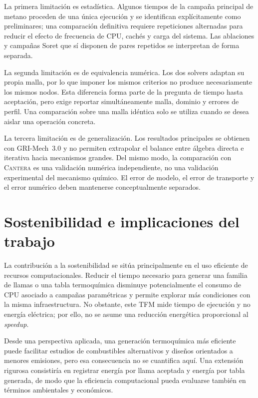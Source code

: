 \documentclass[12pt,a4paper,twoside,openany]{book}
\newcommand{\Cantera}{\textsc{Cantera}\xspace}
\begin{document}
La primera limitación es estadística. Algunos tiempos de la campaña principal de
metano proceden de una única ejecución y se identifican explícitamente como
preliminares; una comparación definitiva requiere repeticiones alternadas para
reducir el efecto de frecuencia de CPU, cachés y carga del sistema. Las
ablaciones y campañas Soret que sí disponen de pares repetidos se interpretan de
forma separada.

La segunda limitación es de equivalencia numérica. Los dos solvers adaptan su
propia malla, por lo que imponer los mismos criterios no produce necesariamente
los mismos nodos. Esta diferencia forma parte de la pregunta de tiempo hasta
aceptación, pero exige reportar simultáneamente malla, dominio y errores de
perfil. Una comparación sobre una malla idéntica solo se utiliza cuando se desea
aislar una operación concreta.

La tercera limitación es de generalización. Los resultados principales se
obtienen con GRI-Mech~3.0 y no permiten extrapolar el balance entre álgebra
directa e iterativa hacia mecanismos grandes. Del mismo modo, la comparación
con \Cantera es una validación numérica independiente, no una validación
experimental del mecanismo químico. El error de modelo, el error de transporte
y el error numérico deben mantenerse conceptualmente separados.

\section{Sostenibilidad e implicaciones del trabajo}

La contribución a la sostenibilidad se sitúa principalmente en el uso eficiente
de recursos computacionales. Reducir el tiempo necesario para generar una
familia de llamas o una tabla termoquímica disminuye potencialmente el consumo de
CPU asociado a campañas paramétricas y permite explorar más condiciones con la
misma infraestructura. No obstante, este TFM mide tiempo de ejecución y no
energía eléctrica; por ello, no se asume una reducción energética proporcional
al \emph{speedup}.

Desde una perspectiva aplicada, una generación termoquímica más eficiente puede
facilitar estudios de combustibles alternativos y diseños orientados a menores
emisiones, pero esa consecuencia no se cuantifica aquí. Una extensión rigurosa
consistiría en registrar energía por llama aceptada y energía por tabla generada,
de modo que la eficiencia computacional pueda evaluarse también en términos
ambientales y económicos.
\end{document}
